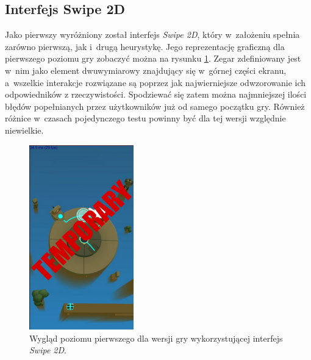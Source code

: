 \documentclass[a4paper,12pt,numbers=noenddot]{report}
\begin{document}
\subsection{Interfejs Swipe 2D}
Jako pierwszy wyróżniony został interfejs \textit{Swipe 2D}, który w~założeniu spełnia zarówno pierwszą, jak i~drugą heurystykę. Jego reprezentację graficzną dla pierwszego poziomu gry zobaczyć można na rysunku \ref{fig:interface_Swipe_2d}. Zegar zdefiniowany jest w~nim jako element dwuwymiarowy znajdujący się w~górnej części ekranu, a~wszelkie interakcje rozwiązane są poprzez jak najwierniejsze odwzorowanie ich odpowiedników z rzeczywistości. Spodziewać się zatem można najmniejszej ilości błędów popełnianych przez użytkowników już od samego początku gry. Również różnice w~czasach pojedynczego testu powinny być dla tej wersji względnie niewielkie.
\begin{figure}[h!]
	\centering
  	\includegraphics[height=8cm]{fig/tmp.jpg}
	\caption{Wygląd poziomu pierwszego dla wersji gry wykorzystującej interfejs \textit{Swipe 2D}.}
	\label{fig:interface_Swipe_2d}
\end{figure}
\end{document}
